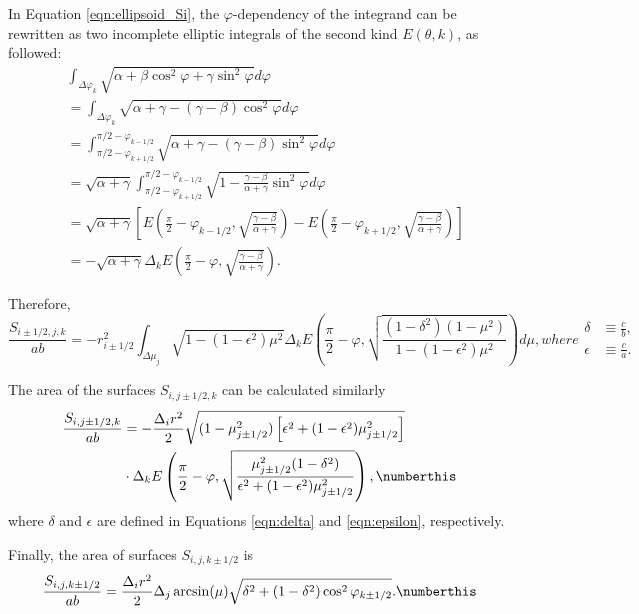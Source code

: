In Equation \ref{eqn:ellipsoid_Si}, the $\varphi$-dependency of the integrand can be rewritten as two incomplete elliptic integrals of the second kind $E(\theta, k)$, as followed:
\begin{subequations}
    \begin{align}
        &\int_{\Delta\varphi_k} \sqrt{\alpha + \beta \cos^2\varphi + \gamma \sin^2 \varphi} d\varphi \\
        &= \int_{\Delta\varphi_k} \sqrt{\alpha + \gamma - (\gamma - \beta)\cos^2\varphi} d\varphi \\
        &= \int_{\pi/2 - \varphi_{k+1/2}}^{\pi/2 - \varphi_{k-1/2}} \sqrt{\alpha + \gamma - (\gamma - \beta)\sin^2\varphi} d\varphi \\
        &= \sqrt{\alpha + \gamma} \int_{\pi/2 - \varphi_{k+1/2}}^{\pi/2 - \varphi_{k-1/2}} \sqrt{1 - \frac{\gamma - \beta}{\alpha + \gamma} \sin^2\varphi} d\varphi \\
        &= \sqrt{\alpha + \gamma} \left[ E\left(\frac{\pi}{2} - \varphi_{k-1/2}, \sqrt{\frac{\gamma - \beta}{\alpha + \gamma}} \right) - E\left(\frac{\pi}{2} - \varphi_{k+1/2}, \sqrt{\frac{\gamma - \beta}{\alpha + \gamma}} \right)\right] \\
        &= -\sqrt{\alpha + \gamma} \Delta_k E\left(\frac{\pi}{2} - \varphi, \sqrt{\frac{\gamma - \beta}{\alpha + \gamma}} \right).
    \end{align}    
\end{subequations}

Therefore,
\begin{subequations}
    \label{eqn:ellipsoidal_Si_final}
    \begin{equation}
        \frac{S_{i \pm 1/2,j,k}}{ab} = -r_{i\pm1/2}^2 \int_{\Delta\mu_j} \sqrt{1-(1-\epsilon^2)\mu^2} \Delta_k E\left(\frac{\pi}{2} - \varphi, \sqrt{\frac{(1 - \delta^2)(1 - \mu^2)}{1 - (1-\epsilon^2)\mu^2}} \right) d\mu,
    \end{equation}
    where
    \begin{align}
        \delta &\equiv \frac{c}{b}, \label{eqn:delta} \\
        \epsilon &\equiv \frac{c}{a}. \label{eqn:epsilon}
    \end{align}
\end{subequations}

The area of the surfaces $S_{i,j \pm 1/2,k}$ can be calculated similarly
\begin{align*}
    \frac{S_{i,j \pm 1/2,k}}{ab} &= -\frac{\Delta_i r^2}{2} \sqrt{( 1 - \mu_{j \pm 1/2}^2) \left[\epsilon^2 + (1 - \epsilon^2)\mu_{j \pm 1/2}^2 \right]} \\
    &\cdot \Delta_k E\left(\frac{\pi}{2} - \varphi, \sqrt{\frac{\mu_{j \pm 1/2}^2(1 - \delta^2)}{\epsilon^2 + (1 - \epsilon^2)\mu_{j \pm 1/2}^2}} \right),
    \numberthis \label{eqn:ellipsoidal_Sj}
\end{align*}
where $\delta$ and $\epsilon$ are defined in Equations \ref{eqn:delta} and \ref{eqn:epsilon}, respectively.

Finally, the area of surfaces $S_{i,j,k \pm 1/2}$ is
\begin{equation}
    \frac{S_{i,j,k \pm 1/2}}{ab} = \frac{\Delta_i r^2}{2} \Delta_j \arcsin(\mu) \sqrt{\delta^2 + (1-\delta^2)\cos^2{\varphi_{k \pm 1/2}}}.
    \numberthis \label{eqn:ellipsoidal_Sk}  
\end{equation}
